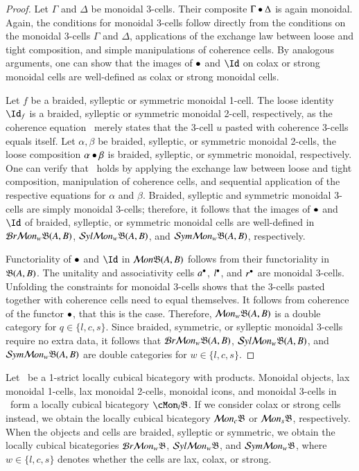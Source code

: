\begin{proof}
Let $\Gamma$ and $\Delta$ be monoidal 3-cells. Their composite $\Gamma \bullet \Delta$ is again monoidal. Again, the conditions for monoidal 3-cells follow directly from the conditions on the monoidal 3-cells $\Gamma$ and $\Delta$, applications of the exchange law between loose and tight composition, and simple manipulations of coherence cells.
By analogous arguments, one can show that the images of $\bullet$ and $\looseid$ on colax or strong monoidal cells are well-defined as colax or strong monoidal cells. 

Let $f$ be a braided, sylleptic or symmetric monoidal 1-cell. The loose identity $\looseid_f$ is a braided, sylleptic or symmetric monoidal 2-cell, respectively, as the coherence equation~\cite[(BTA1) p143]{mccrudden:bal-coalgb} merely states that the 3-cell $u$ pasted with coherence 3-cells equals itself. Let $\alpha, \beta$ be braided, sylleptic, or symmetric monoidal 2-cells, the loose composition $\alpha \bullet \beta$ is braided, sylleptic, or symmetric monoidal, respectively. One can verify that~\cite[(BTA1) p143]{mccrudden:bal-coalgb} holds by applying the exchange law between loose and tight composition, manipulation of coherence cells, and sequential application of the respective equations for $\alpha$ and $\beta$.  Braided, sylleptic and symmetric monoidal 3-cells are simply monoidal 3-cells; therefore, it follows that the images of $\bullet$ and $\looseid$ of braided, sylleptic, or symmetric monoidal cells are well-defined in $\mathcal{B} r \mathcal{M} on_w\mathfrak{B}(A,B)$, $\mathcal{S} yl \mathcal{M} on_w\mathfrak{B}(A,B)$, and $\mathcal{S} ym \mathcal{M} on_w\mathfrak{B}(A,B)$, respectively.

Functoriality of $\bullet$ and $\looseid$ in $\mathcal{M} on \mathfrak{B}(A,B)$ follows from their functoriality in $\mathfrak{B}(A,B)$. 
The unitality and associativity cells $a^{\bullet}$, $l^{\bullet}$, and $r^{\bullet}$ are monoidal 3-cells. Unfolding the constraints for monoidal 3-cells shows that the 3-cells pasted together with coherence cells need to equal themselves. It follows from coherence of the functor $\bullet$, that this is the case. Therefore,  $\mathcal{M} on_w\mathfrak{B}(A,B)$ is a double category for $q \in \{l,c,s\}$. 
Since braided, symmetric, or sylleptic monoidal 3-cells require no extra data, it follows that $\mathcal{B} r \mathcal{M} on_w\mathfrak{B}(A,B)$, $\mathcal{S} yl \mathcal{M} on_w\mathfrak{B}(A,B)$, and $\mathcal{S} ym \mathcal{M} on_w\mathfrak{B}(A,B)$ are double categories for $w \in \{l,c,s\}$.
\end{proof}

\begin{thm}\label{thm:lcbc}
Let \fB\ be a 1-strict locally cubical bicategory with products. Monoidal objects, lax monoidal 1-cells, lax monoidal 2-cells, monoidal icons, and monoidal 3-cells in  \fB\ form a locally cubical bicategory $\cMon_l\fB$. 
  If we consider colax or strong cells instead, we obtain the locally cubical bicategory $\mathcal{M} on_c\mathfrak{B}$ or $\mathcal{M} on_s\mathfrak{B}$, respectively. When the objects and cells are braided, sylleptic or symmetric,  we obtain the locally cubical bicategories $\mathcal{B} r \mathcal{M} on_w\mathfrak{B}$, $\mathcal{S} yl \mathcal{M} on_w\mathfrak{B}$, and $\mathcal{S} ym \mathcal{M} on_w\mathfrak{B}$, where $w \in \{l,c,s\}$ denotes whether the cells are lax, colax, or strong.
\end{thm}

